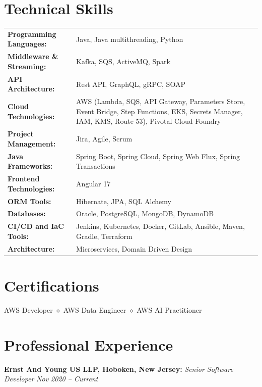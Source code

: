 \documentclass[11pt,a4paper]{article}
\begin{document}
\section{Technical Skills}
\renewcommand{\arraystretch}{1.1}
\begin{tabularx}{\textwidth}{@{}lX@{}}
    \textbf{Programming Languages:} & Java, Java multithreading, Python\\
    \textbf{Middleware \& Streaming:} & Kafka, SQS, ActiveMQ, Spark\\
    \textbf{API Architecture:} & Rest API, GraphQL, gRPC, SOAP\\
    \textbf{Cloud Technologies:} & AWS (Lambda, SQS, API Gateway, Parameters Store, Event Bridge, Step Functions, EKS, Secrets Manager, IAM, KMS, Route 53), Pivotal Cloud Foundry\\
    \textbf{Project Management:} & Jira, Agile, Scrum\\
    \textbf{Java Frameworks:} & Spring Boot, Spring Cloud, Spring Web Flux, Spring Transactions\\
    \textbf{Frontend Technologies:} & Angular 17\\
    \textbf{ORM Tools:} & Hibernate, JPA, SQL Alchemy\\
    \textbf{Databases:} & Oracle, PostgreSQL, MongoDB, DynamoDB\\
    \textbf{CI/CD and IaC Tools:} & Jenkins, Kubernetes, Docker, GitLab, Ansible, Maven, Gradle, Terraform\\
    \textbf{Architecture:} & Microservices, Domain Driven Design\\
\end{tabularx}
\renewcommand{\arraystretch}{1}

\section{Certifications}
\begin{center}
    AWS Developer \quad $\diamond$ \quad AWS Data Engineer \quad $\diamond$ \quad AWS AI Practitioner
\end{center}

\section{Professional Experience}

\textbf{Ernst And Young US LLP, Hoboken, New Jersey:} \textit{Senior Software Developer} \hfill \textit{Nov 2020 -- Current}\\[0.1em]
\end{document}
